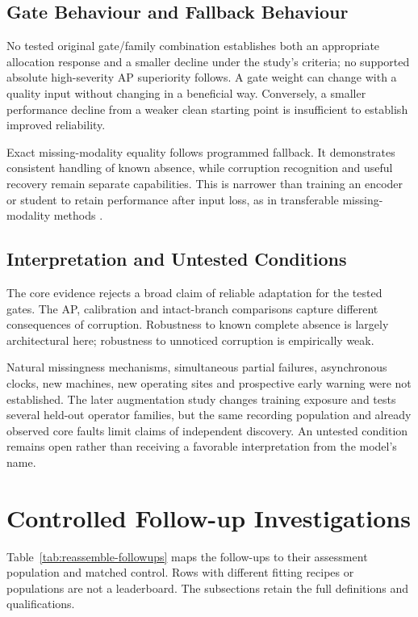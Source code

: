 \subsection{Gate Behaviour and Fallback Behaviour}
No tested original gate/family combination establishes both an appropriate allocation
response and a smaller decline under the study's criteria; no supported absolute
high-severity AP superiority follows. A gate weight can change with a quality input
without changing in a beneficial way. Conversely, a smaller performance decline from a
weaker clean starting point is insufficient to establish improved reliability.

Exact missing-modality equality follows programmed fallback. It demonstrates consistent
handling of known absence, while corruption recognition and useful recovery remain
separate capabilities. This is narrower than training an encoder or student to retain
performance after input loss, as in transferable missing-modality methods
\citep{P005,P007,P016}.

\subsection{Interpretation and Untested Conditions}
The core evidence rejects a broad claim of reliable adaptation for the tested gates. The
AP, calibration and intact-branch comparisons capture different consequences of
corruption. Robustness to known complete absence is largely architectural here;
robustness to unnoticed corruption is empirically weak.

Natural missingness mechanisms, simultaneous partial failures, asynchronous clocks, new
machines, new operating sites and prospective early warning were not established. The
later augmentation study changes training exposure and tests several held-out operator
families, but the same recording population and already observed core faults limit
claims of independent discovery. An untested condition remains open rather than
receiving a favorable interpretation from the model's name.

\section{Controlled Follow-up Investigations}
\label{sec:reassemble-followups}
Table~\ref{tab:reassemble-followups} maps the follow-ups to their assessment population
and matched control. Rows with different fitting recipes or populations are not a
leaderboard. The subsections retain the full definitions and qualifications.

